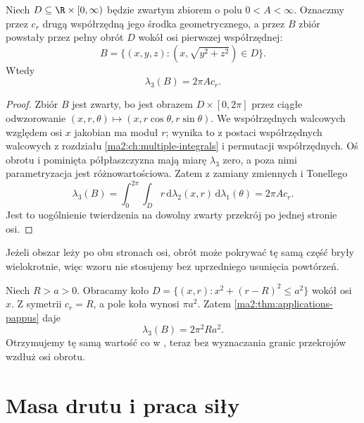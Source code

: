 \begin{twierdzenie}
\label{ma2:thm:applications-pappus}
Niech $D\subseteq\R\times[0,\infty)$ będzie
zwartym zbiorem o polu $0<A<\infty$.
Oznaczmy przez $c_r$ drugą współrzędną
jego środka geometrycznego, a przez $B$
zbiór powstały przez pełny obrót $D$ wokół
osi pierwszej współrzędnej:
\[
 B=\{(x,y,z):(x,\sqrt{y^2+z^2})\in D\}.
\]
Wtedy
\[
 \lambda_3(B)=2\pi A c_r.
\]
\end{twierdzenie}
\begin{proof}
Zbiór $B$ jest zwarty, bo jest obrazem
$D\times[0,2\pi]$ przez ciągłe odwzorowanie
$(x,r,\theta)\mapsto(x,r\cos\theta,r\sin\theta)$.
We współrzędnych walcowych względem osi $x$
jakobian ma moduł $r$; wynika to z postaci
współrzędnych walcowych z rozdziału
\ref{ma2:ch:multiple-integrals}
i permutacji współrzędnych.
Oś obrotu i pominięta półpłaszczyzna
mają miarę $\lambda_3$ zero, a poza nimi
parametryzacja jest różnowartościowa.
Zatem z zamiany zmiennych i Tonellego
\[
 \lambda_3(B)
 =\int_0^{2\pi}\int_D r\,\mathrm d\lambda_2(x,r)
 \,\mathrm d\lambda_1(\theta)
 =2\pi A c_r.
\]
Jest to uogólnienie twierdzenia
na dowolny zwarty przekrój po jednej stronie osi.
\end{proof}
Jeżeli obszar leży po obu stronach osi,
obrót może pokrywać tę samą część bryły
wielokrotnie, więc wzoru nie stosujemy
bez uprzedniego usunięcia powtórzeń.

\begin{przyklad}
\label{ma2:ex:applications-torus}
Niech $R>a>0$.
Obracamy koło $D=\{(x,r):x^2+(r-R)^2\le a^2\}$
wokół osi $x$. Z symetrii $c_r=R$,
a pole koła wynosi $\pi a^2$.
Zatem \ref{ma2:thm:applications-pappus} daje
\[
 \lambda_3(B)=2\pi^2Ra^2.
\]
Otrzymujemy tę samą wartość co w
,
teraz bez wyznaczania granic przekrojów
wzdłuż osi obrotu.
\end{przyklad}

\section{Masa drutu i praca siły}

